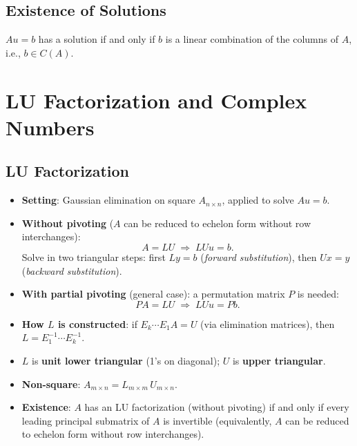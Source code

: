 \documentclass[hidelinks]{article}
\begin{document}
\subsection{Existence of Solutions}
$Au = b$ has a solution if and only if $b$ is a linear combination of the columns of $A$, i.e., $b \in C(A)$.

\section{LU Factorization and Complex Numbers}

\subsection{LU Factorization}
\begin{itemize}
    \item \textbf{Setting}: Gaussian elimination on square $A_{n\times n}$, applied to solve $Au = b$.
    \item \textbf{Without pivoting} ($A$ can be reduced to echelon form without row interchanges):
    \[
        A = LU \;\Longrightarrow\; LUu = b.
    \]
    Solve in two triangular steps: first $Ly = b$ (\emph{forward substitution}), then $Ux = y$ (\emph{backward substitution}).
    \item \textbf{With partial pivoting} (general case): a permutation matrix $P$ is needed:
    \[
        PA = LU \;\Longrightarrow\; LUu = Pb.
    \]
    \item \textbf{How $L$ is constructed}: if $E_k\cdots E_1 A = U$ (via elimination matrices), then $L = E_1^{-1}\cdots E_k^{-1}$.
    \item $L$ is \textbf{unit lower triangular} (1's on diagonal); $U$ is \textbf{upper triangular}.
    \item \textbf{Non-square}: $A_{m\times n} = L_{m\times m}\, U_{m\times n}$.
    \item \textbf{Existence}: $A$ has an LU factorization (without pivoting) if and only if every leading principal submatrix of $A$ is invertible (equivalently, $A$ can be reduced to echelon form without row interchanges).
\end{itemize}
\end{document}
